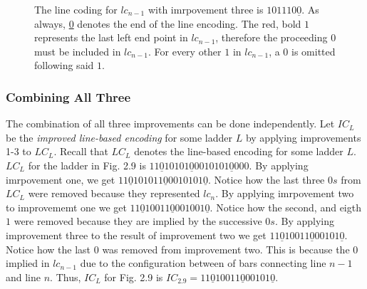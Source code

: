 \begin{figure}[!htp]
    \centering
    \caption{The line coding for $lc_{n-1}$ with imrpovement three is $101110\underline{0}$.
    As always, \underline{0} denotes the end of the line encoding. The red, bold $1$ represents 
    the last left end point in $lc_{n-1}$, therefore the proceeding $0$ must be 
    included in $lc_{n-1}$. For every other $1$ in $lc_{n-1}$, a $0$ is omitted following 
    said $1$.}
\end{figure}
\subsubsection{Combining All Three}
The combination of all three improvements can be done independently. 
Let $IC_{L}$ be the \emph{improved line-based encoding} for some ladder $L$ 
by applying improvements 1-3 to $LC_{L}$. Recall that $LC_{L}$ denotes the line-based encoding for some ladder $L$.
$LC_{L}$ for the ladder in Fig. 2.9 is $11\underline{0}10101\underline{0}0010101\underline{0}000$.
By applying imrpovement one, we get $11\underline{0}101011\underline{0}0010101\underline{0}$. 
Notice how the last three $0s$ from $LC_{L}$ were removed because they represented $lc_{n}$.
By applying imrpovement two to improvememt one we get $11\underline{0}10011\underline{0}001001\underline{0}$.
Notice how the second, and eigth $1$ were removed because they are implied by 
the successive $0s$. By applying improvement three to the result of improvement 
two we get $11\underline{0}10011\underline{0}00101\underline{0}$. Notice how the last $0$ 
was removed from improvement two. This is because the $0$ implied in $lc_{n-1}$
due to the configuration between of bars connecting line $n-1$ and line $n$.
Thus, $IC_{L}$ for Fig. 2.9 is $IC_{2.9}=11\underline{0}10011\underline{0}00101\underline{0}$.\pagebreak

